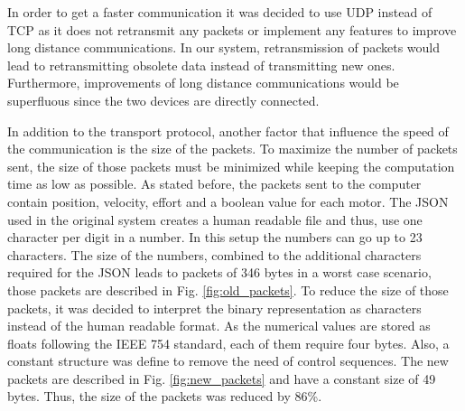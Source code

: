 In order to get a faster communication it was decided to use UDP instead of TCP as it does not retransmit any packets or implement any features to improve long distance communications. In our system, retransmission of packets would lead to retransmitting obsolete data instead of transmitting new ones. Furthermore, improvements of long distance communications would be superfluous since the two devices are directly connected.

In addition to the transport protocol, another factor that influence the speed of the communication is the size of the packets. To maximize the number of packets sent, the size of those packets must be minimized while keeping the computation time as low as possible. As stated before, the packets sent to the computer contain position, velocity, effort and a boolean value for each motor. The JSON used in the original system creates a human readable file and thus, use one character per digit in a number. In this setup the numbers can go up to 23 characters. The size of the numbers, combined to the additional characters required for the JSON leads to packets of 346 bytes in a worst case scenario, those packets are described in Fig. \ref{fig:old_packets}. To reduce the size of those packets, it was decided to interpret the binary representation as characters instead of the human readable format. As the numerical values are stored as floats following the IEEE 754 standard\cite{IEEE_754}, each of them require four bytes. Also, a constant structure was define to remove the need of control sequences. The new packets are described in Fig. \ref{fig:new_packets} and have a constant size of 49 bytes. Thus, the size of the packets was reduced by 86\%.

